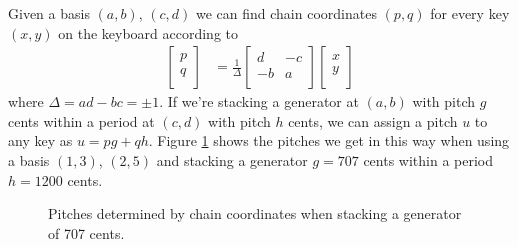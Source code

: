 \documentclass[a4paper,11pt]{article}
\begin{document}
Given a basis $(a, b)$, $(c, d)$ we can find chain coordinates $(p, q)$ for
every key $(x, y)$ on the keyboard according to
\begin{align}
\begin{bmatrix}
    p \\
    q \\
\end{bmatrix}
    &=
\frac{1}{\Delta}
\begin{bmatrix}
    d & -c \\
    -b & a \\
\end{bmatrix}
\begin{bmatrix}
    x \\
    y \\
\end{bmatrix}
\end{align}
where $\Delta = ad - bc = \pm 1$. If we're stacking a generator at $(a, b)$
with pitch $g$ cents within a period at $(c, d)$ with pitch $h$ cents, we can
assign a pitch $u$ to any key as $u = pg + qh$. Figure \ref{fig:stack} shows
the pitches we get in this way when using a basis $(1, 3)$, $(2, 5)$ and
stacking a generator $g = 707$ cents within a period $h = 1200$ cents.

\begin{figure}
\begin{center}

\end{center}
\caption{Pitches determined by chain coordinates when stacking a generator of
707 cents.}
\label{fig:stack}
\end{figure}
\end{document}
